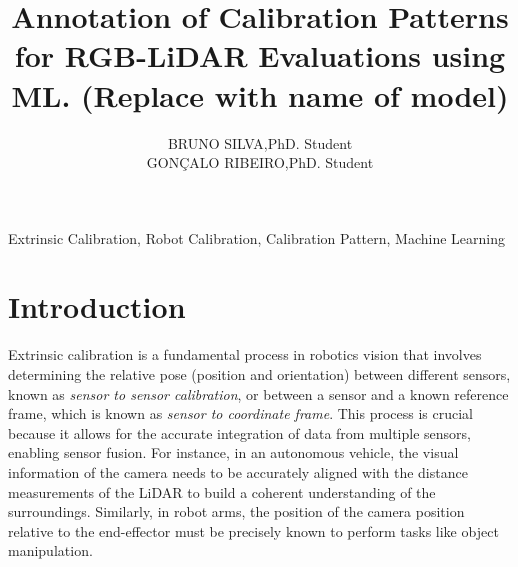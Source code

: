 \documentclass{ieeeaccess}
\begin{document}

\title{Annotation of Calibration Patterns for RGB-LiDAR Evaluations using ML. (Replace with name
of model)}
\author{\uppercase{Bruno Silva},PhD. Student\\
\uppercase{Gonçalo Ribeiro},PhD. Student}

\address[1]{Department of Mechanical Engineering, University of Aveiro}



\begin{abstract}
  \lipsum[1-2]
\end{abstract}

\begin{keywords}
Extrinsic Calibration, Robot Calibration, Calibration Pattern, Machine Learning
\end{keywords}

\titlepgskip=-21pt

\maketitle

\section{Introduction}
\label{sec:introduction}

Extrinsic calibration is a fundamental process in robotics vision that involves determining the
relative pose (position and orientation) between different sensors, known as \textit{sensor to sensor calibration}, or between a sensor and a known reference
frame, which is known as \textit{sensor to coordinate frame}. This process is crucial because it allows for the accurate integration of data from multiple sensors,
enabling sensor fusion. For instance, in an autonomous vehicle, the visual information of the camera
needs to be accurately aligned with the distance measurements of the LiDAR to build a coherent understanding of the
surroundings. Similarly, in robot arms, the position of the camera position relative to the end-effector must be precisely
known to perform tasks like object manipulation. 
\end{document}
